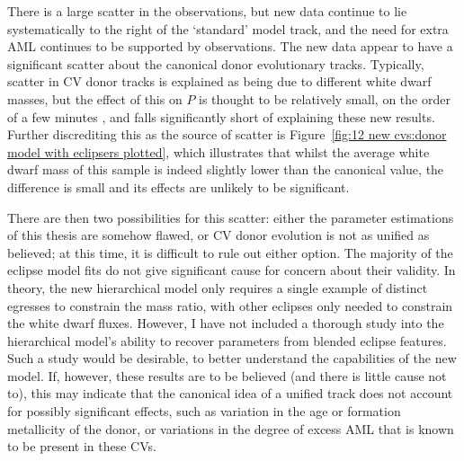 There is a large scatter in the observations, but new data continue to lie systematically to the right of the `standard' model track, and the need for extra AML continues to be supported by observations.
The new data appear to have a significant scatter about the canonical donor evolutionary tracks.
Typically, scatter in CV donor tracks is explained as being due to different white dwarf masses, but the effect of this on $P$ is thought to be relatively small, on the order of a few minutes \citep{goliasch2015}, and falls significantly short of explaining these new results.
Further discrediting this as the source of scatter is Figure~\ref{fig:12 new cvs:donor model with eclipsers plotted}, which illustrates that whilst the average white dwarf mass of this sample is indeed slightly lower than the canonical \citet{pala2020} value, the difference is small and its effects are unlikely to be significant.

There are then two possibilities for this scatter: either the parameter estimations of this thesis are somehow flawed, or CV donor evolution is not as unified as believed; at this time, it is difficult to rule out either option.
The majority of the eclipse model fits do not give significant cause for concern about their validity. In theory, the new hierarchical model only requires a single example of distinct egresses to constrain the mass ratio, with other eclipses only needed to constrain the white dwarf fluxes. However, I have not included a thorough study into the hierarchical model's ability to recover parameters from blended eclipse features. Such a study would be desirable, to better understand the capabilities of the new model.
If, however, these results are to be believed (and there is little cause not to), this may indicate that the canonical idea of a unified track does not account for possibly significant effects, such as variation in the age or formation metallicity of the donor, or variations in the degree of excess AML that is known to be present in these CVs.


